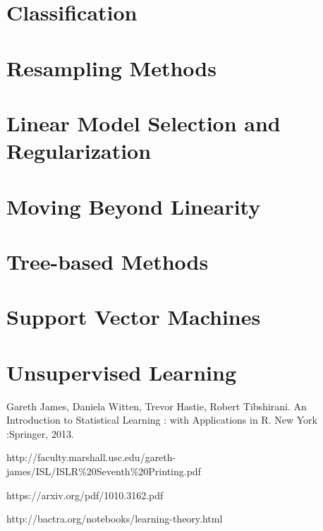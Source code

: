 \documentclass{article}
\newcommand{\comment}[1]{}
\begin{document}
\begin{enumerate}
\section{Classification}

\section{Resampling Methods}

\section{Linear Model Selection and Regularization}

\section{Moving Beyond Linearity}

\section{Tree-based Methods}

\section{Support Vector Machines}

\section{Unsupervised Learning}

\end{enumerate}


\comment{
- left off: pg 47, video:  Lect3 4b 110613
- 
}


\begin{thebibliography}{}
\bibitem[]{}
Gareth James, Daniela Witten, Trevor Hastie, Robert Tibshirani. An Introduction to Statistical Learning : with Applications in R. New York :Springer, 2013.


http://faculty.marshall.usc.edu/gareth-james/ISL/ISLR\%20Seventh\%20Printing.pdf



\bibitem[]{}
https://arxiv.org/pdf/1010.3162.pdf

\bibitem[]{}
http://bactra.org/notebooks/learning-theory.html

\end{thebibliography}
\end{document}
